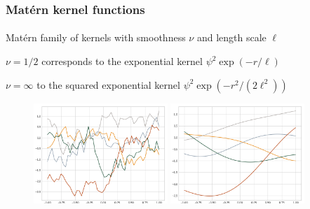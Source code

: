 \documentclass{beamer}                             %
\newenvironment{wideitemize}
  {\itemize\setlength{\itemsep}{0.5cm}}
  {\enditemize}
\begin{document}
\begin{frame}
\frametitle{Mat{\'e}rn kernel functions}
\framesubtitle{}

\begin{wideitemize}
  \item Mat{\'e}rn family of kernels with
    smoothness \( \nu \) and length scale \( \ell \)
  \item\( \nu = 1/2 \) corresponds to the
    exponential kernel \( \psi^2 \exp(-r/\ell) \)
  \item \( \nu = \infty \) to the squared
    exponential kernel \( \psi^2 \exp(-r^2/(2 \ell^2)) \)
\end{wideitemize}
\begin{figure}[b]
  \centering
  \includegraphics[width=0.45\textwidth]{figures/matern/exp.png}%
  \qquad%
  \includegraphics[width=0.45\textwidth]{figures/matern/sqexp.png}%
\end{figure}
\end{frame}
\end{document}
